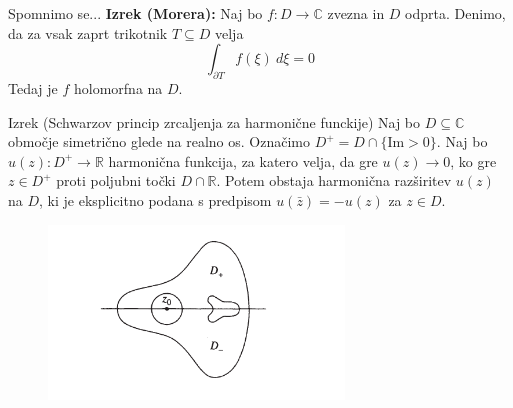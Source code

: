 \documentclass{beamer}
\theoremstyle{definition}
\theoremstyle{definition}
\begin{document}
\begin{frame}
   \begin{alertblock}{Spomnimo se...}
      \textbf{Izrek (Morera):} \newline
      Naj bo $f: D \to \mathbb{C}$ zvezna in $D$ odprta. 
      Denimo, da za vsak zaprt trikotnik $T \subseteq D$ velja 
      $$
      \int_{\partial T} {f(\xi)~d\xi} = 0
      $$
      Tedaj je $f$ holomorfna na $D$.
   \end{alertblock}
\end{frame}

\begin{frame}
   \begin{exampleblock}{Izrek (Schwarzov princip zrcaljenja za harmonične funckije)}
      Naj bo $D \subseteq \mathbb{C}$ območje simetrično glede na realno os. 
      Označimo $D^{+} = D \cap \{\text{Im} > 0\}$. 
      Naj bo $u(z): D^{+} \to \mathbb{R}$ harmonična funkcija, za katero velja, da gre $u(z) \to 0$, ko gre $z \in D^{+}$ proti poljubni točki $D \cap \mathbb{R}$. 
      \newline
      Potem obstaja harmonična razširitev $u(z)$ na $D$, ki je eksplicitno podana s predpisom $u(\bar{z}) = - u(z)$ za $z \in D$.
   \end{exampleblock}
   \pause
   \begin{figure}
   \begin{center}
      \includegraphics[width=0.70\textwidth]{schwarzov_princip_zrcaljenja.png}
   \end{center}
\end{figure}
\end{frame}

\end{document}
